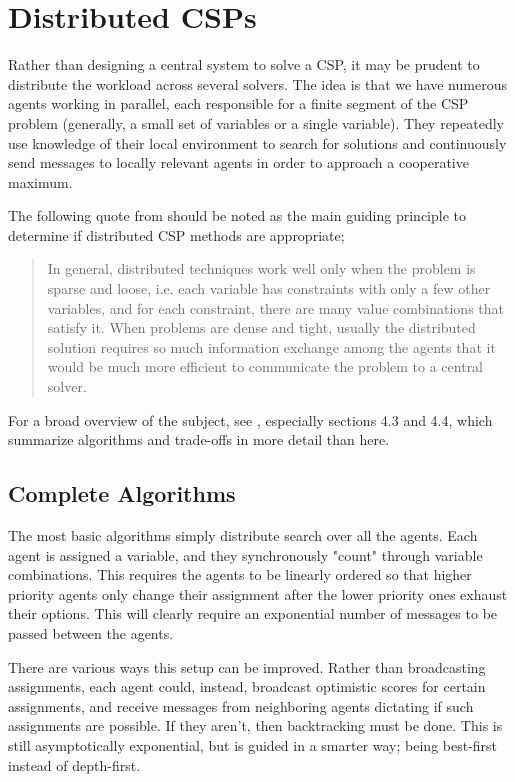 \section{Distributed CSPs}\label{sec:distributed-csps}

Rather than designing a central system to solve a CSP, it may be prudent to distribute the workload across several solvers. The idea is that we have numerous agents working in parallel, each responsible for a finite segment of the CSP problem (generally, a small set of variables or a single variable). They repeatedly use knowledge of their local environment to search for solutions and continuously send messages to locally relevant agents in order to approach a cooperative maximum.

The following quote from \citep{rossi2006handbook} should be noted as the main guiding principle to determine if distributed CSP methods are appropriate;

\begin{quote}
    In general, distributed techniques work well only when the problem is sparse and loose, i.e. each variable has constraints with only a few other variables, and for each constraint, there are many value combinations that satisfy it. When problems are dense and tight, usually the distributed solution requires so much information exchange among the agents that it would be much more efficient to communicate the problem to a central solver.
\end{quote}

For a broad overview of the subject, see \citep{fioretto2018distributed}, especially sections 4.3 and 4.4, which summarize algorithms and trade-offs in more detail than here.

\subsection{Complete Algorithms}\label{sec:complete-algorithms}

The most basic algorithms simply distribute search over all the agents. Each agent is assigned a variable, and they synchronously "count" through variable combinations. This requires the agents to be linearly ordered so that higher priority agents only change their assignment after the lower priority ones exhaust their options. This will clearly require an exponential number of messages to be passed between the agents.

There are various ways this setup can be improved. Rather than broadcasting assignments, each agent could, instead, broadcast optimistic scores for certain assignments, and receive messages from neighboring agents dictating if such assignments are possible. If they aren't, then backtracking must be done. This is still asymptotically exponential, but is guided in a smarter way; being best-first instead of depth-first.

